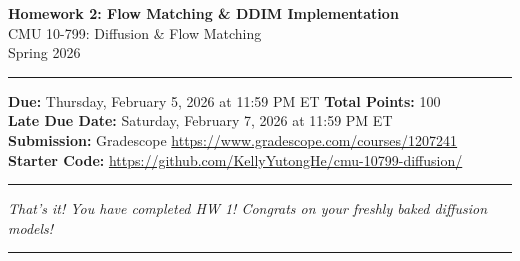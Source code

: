 \documentclass[11pt]{article}
\newif\ifshowanswers
\newcommand{\hwtitle}[2]{
    \begin{center}
        {\Large\bfseries\textcolor{cmured}{Homework #1: #2}}\\[0.5em]
        {\large CMU 10-799: Diffusion \& Flow Matching}\\[0.3em]
        {\normalsize Spring 2026}\\[0.5em]
        \ifshowanswers
            {\large\textcolor{answergreen}{\textbf{--- SOLUTIONS ---}}}\\[0.5em]
        \fi
        \rule{0.6\textwidth}{0.5pt}
    \end{center}
    \vspace{1em}
}
\newcommand{\hwinfo}[3]{
    \begin{tcolorbox}[
        colback=cmulight,
        colframe=cmugray,
        boxrule=0.5pt,
        arc=2pt,
        left=10pt,
        right=10pt,
        top=8pt,
        bottom=8pt
    ]
        \textbf{Due:} #1 \hfill \textbf{Total Points:} #2\\[0.3em]
        #3
    \end{tcolorbox}
    \vspace{1em}
}
\begin{document}
\hwtitle{2}{Flow Matching \& DDIM Implementation}

\hwinfo{Thursday, February 5, 2026 at 11:59 PM ET}{100}{
    \textbf{Late Due Date:} Saturday, February 7, 2026 at 11:59 PM ET \\
    \textbf{Submission:} Gradescope \url{https://www.gradescope.com/courses/1207241} \\
    \textbf{Starter Code:} \url{https://github.com/KellyYutongHe/cmu-10799-diffusion/}
}











\vspace{2em}
\hrule
\vspace{1em}
\textit{\textcolor{cmured}{That's it! You have completed HW 1! Congrats on your freshly baked diffusion models!}}


\vspace{2em}
\noindent{\Large\bfseries\textcolor{cmured}{References}}
\vspace{0.4em}
\hrule
\vspace{0.6em}
\renewcommand{\bibsection}{}


\end{document}
